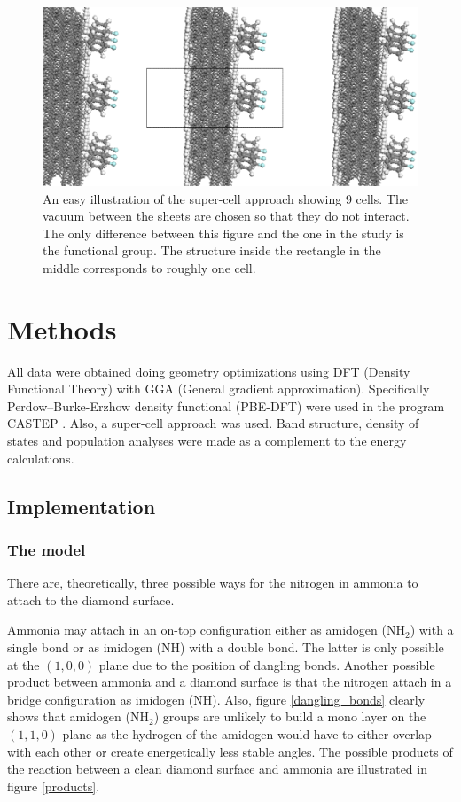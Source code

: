 \documentclass[10pt,a4paper]{article}
\begin{document}
\begin{figure} \captionsetup{width=.8\linewidth} \caption{An easy illustration of the super-cell approach showing 9 cells. The vacuum between the sheets are chosen so that they do not interact. The only difference between this figure and the one in the study is the functional group. The structure inside the rectangle in the middle corresponds to roughly one cell.} \label{supercell}
%
\includegraphics[width=.8\linewidth]{pictures/supercellvacuum.png}
\end{figure}

\section{Methods}
All data were obtained doing geometry optimizations using DFT (Density Functional Theory) with GGA (General gradient approximation). Specifically Perdow--Burke-Erzhow density functional (PBE-DFT) were used in the program CASTEP \cite{castep}. Also, a super-cell approach was used. Band structure, density of states and population analyses were made as a complement to the energy calculations. 

\subsection{Implementation}
\subsubsection{The model}
There are, theoretically, three possible ways for the nitrogen in ammonia to attach to the diamond surface.  

Ammonia may attach in an on-top configuration either as amidogen (NH$_2$) with a single bond or as imidogen (NH) with a double bond. The latter is only possible at the $(1,  0,  0)$ plane due to the position of dangling bonds. Another possible product between ammonia and a diamond surface is that the nitrogen  attach in a bridge configuration as imidogen (NH).  Also, figure \ref{dangling_bonds}  clearly shows that amidogen (NH$_2$) groups are unlikely to build a mono layer on the $(1,  1,  0)$ plane as the hydrogen of the amidogen would have to either overlap with each other or create energetically less stable angles. The possible products of the reaction between a clean diamond surface and ammonia are illustrated in figure \ref{products}.
\end{document}
